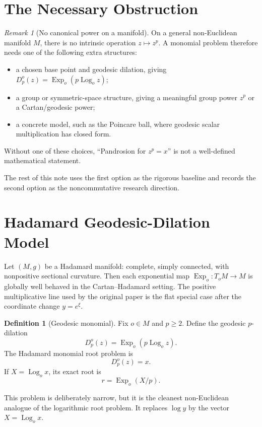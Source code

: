 \documentclass[10pt,a4paper]{article}
\theoremstyle{plain}
\theoremstyle{definition}
\newtheorem{definition}[theorem]{Definition}
\theoremstyle{remark}
\newtheorem{remark}[theorem]{Remark}
\newcommand{\Exp}{\operatorname{Exp}}
\newcommand{\Log}{\operatorname{Log}}
\begin{document}
\section{The Necessary Obstruction}

\begin{remark}[No canonical power on a manifold]
On a general non-Euclidean manifold $M$, there is no intrinsic operation
$z\mapsto z^p$.  A monomial problem therefore needs one of the following extra
structures:
\begin{itemize}
  \item a chosen base point and geodesic dilation, giving
  $D_p^o(z)=\Exp_o(p\Log_o z)$;
  \item a group or symmetric-space structure, giving a meaningful group power
  $z^p$ or a Cartan/geodesic power;
  \item a concrete model, such as the Poincare ball, where geodesic scalar
  multiplication has closed form.
\end{itemize}
Without one of these choices, ``Pandrosion for $z^p=x$'' is not a well-defined
mathematical statement.
\end{remark}

The rest of this note uses the first option as the rigorous baseline and records
the second option as the noncommutative research direction.

\section{Hadamard Geodesic-Dilation Model}

Let $(M,g)$ be a Hadamard manifold: complete, simply connected, with nonpositive
sectional curvature.  Then each exponential map $\Exp_o:T_oM\to M$ is globally
well behaved in the Cartan--Hadamard setting.  The positive multiplicative line
used by the original paper is the flat special case after the coordinate change
$y=e^\xi$.

\begin{definition}[Geodesic monomial]
Fix $o\in M$ and $p\ge2$.  Define the geodesic $p$-dilation
\[
  D_p^o(z)=\Exp_o(p\Log_o z).
\]
The Hadamard monomial root problem is
\[
  D_p^o(z)=x.
\]
If $X=\Log_o x$, its exact root is
\[
  r=\Exp_o(X/p).
\]
\end{definition}

This problem is deliberately narrow, but it is the cleanest non-Euclidean
analogue of the logarithmic root problem.  It replaces $\log y$ by the vector
$X=\Log_o x$.
\end{document}
